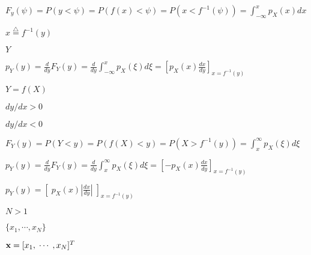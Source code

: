 \documentclass{article}
\def\lthtmlcheckvsize{\ifdim\ht\sizebox<\vsize 
  \ifdim\wd\sizebox<\hsize\expandafter\hfill\fi \expandafter\vfill
  \else\expandafter\vss\fi}%
\begin{document}
{\newpage\clearpage
{}%
$\displaystyle F_y(\psi)=P(y<\psi)=P(f(x)<\psi)=P(x<f^{-1}(\psi))
=\int_{-\infty}^x p_X(x) dx$%
\lthtmlindisplaymathZ
\lthtmlcheckvsize\clearpage}

{\newpage\clearpage
{}%
$ x\stackrel{\triangle}{=}f^{-1}(y)$%
\lthtmlindisplaymathZ
\lthtmlcheckvsize\clearpage}

{\newpage\clearpage
{}%
$ Y$%
\lthtmlindisplaymathZ
\lthtmlcheckvsize\clearpage}

{\newpage\clearpage
{}%
$\displaystyle p_Y(y)=\frac{d}{dy}F_Y(y)
=\frac{d}{dy}\int_{-\infty}^x p_X(\xi)d\xi
=\left[ p_X(x)\frac{dx}{dy}\right]_{x=f^{-1}(y)}$%
\lthtmlindisplaymathZ
\lthtmlcheckvsize\clearpage}

{\newpage\clearpage
{}%
$ Y=f(X)$%
\lthtmlindisplaymathZ
\lthtmlcheckvsize\clearpage}

{\newpage\clearpage
{}%
$ dy/dx>0$%
\lthtmlindisplaymathZ
\lthtmlcheckvsize\clearpage}

{\newpage\clearpage
{}%
$ dy/dx<0$%
\lthtmlindisplaymathZ
\lthtmlcheckvsize\clearpage}

{\newpage\clearpage
{}%
$\displaystyle F_Y(y)=P(Y<y)=P(f(X)<y)=P(X>f^{-1}(y))
=\int_x^{\infty} p_X(\xi) d\xi$%
\lthtmlindisplaymathZ
\lthtmlcheckvsize\clearpage}

{\newpage\clearpage
{}%
$\displaystyle p_Y(y)=\frac{d}{dy}F_Y(y)
=\frac{d}{dy}\int_x^{\infty} p_X(\xi)d\xi
=\left[ -p_X(x)\frac{dx}{dy}\right]_{x=f^{-1}(y)}$%
\lthtmlindisplaymathZ
\lthtmlcheckvsize\clearpage}

{\newpage\clearpage
{}%
$\displaystyle p_Y(y)=\left[\; p_X(x) \left| \frac{dx}{dy} \right| \;\right]_{x=f^{-1}(y)}$%
\lthtmlindisplaymathZ
\lthtmlcheckvsize\clearpage}

{\newpage\clearpage
{}%
$ N>1$%
\lthtmlindisplaymathZ
\lthtmlcheckvsize\clearpage}

{\newpage\clearpage
{}%
$ \{x_1, \cdots, x_N \}$%
\lthtmlindisplaymathZ
\lthtmlcheckvsize\clearpage}

{\newpage\clearpage
{}%
$ {\bf x}=[x_1,\; \cdots \;,x_N]^T $%
\lthtmlindisplaymathZ
\lthtmlcheckvsize\clearpage}
\end{document}
